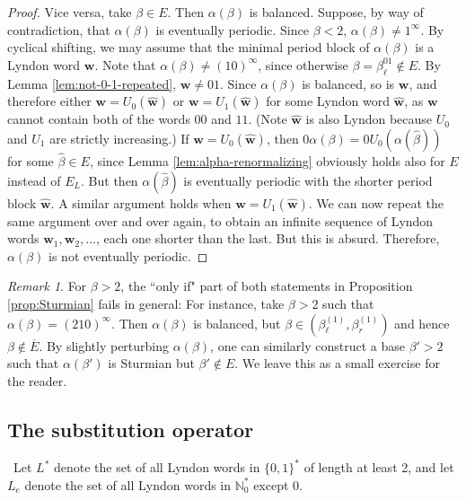 \documentclass[11pt]{amsart}
\theoremstyle{definition}
\theoremstyle{remark}
\newtheorem{remark}[theorem]{Remark}
\numberwithin{equation}{section}
\newcommand{\N}{\ensuremath{\mathbb{N}}}
\newcommand{\w}{\mathbf{w}}
\newcommand{\f}{\infty}
\newcommand{\al}{\alpha}
\begin{document}
\begin{proof}
Vice versa, take $\beta\in E$. Then $\al(\beta)$ is balanced. 
Suppose, by way of contradiction, that $\al(\beta)$ is eventually periodic. Since $\beta<2$, $\al(\beta)\neq 1^\f$. By cyclical shifting, we may assume that the minimal period block of $\al(\beta)$ is a Lyndon word $\w$. Note that $\al(\beta)\ne (10)^\f$, since otherwise $\beta=\beta_\ell^{01}\notin E$. By Lemma \ref{lem:not-0-1-repeated}, $\w\neq 01$. Since $\al(\beta)$ is balanced, so is $\w$, and therefore either $\w=U_0(\hat{\w})$ or $\w=U_1(\hat{\w})$ for some Lyndon word $\hat{\w}$, as $\w$ cannot contain both of the words $00$ and $11$.  (Note $\hat{\w}$ is also Lyndon because $U_0$ and $U_1$ are strictly increasing.) If $\w=U_0(\hat{\w})$, then $0\al(\beta)=0U_0(\al(\hat{\beta}))$ for some $\hat{\beta}\in E$, since Lemma \ref{lem:alpha-renormalizing} obviously holds also for $E$ instead of $E_L$. But then $\al(\hat{\beta})$ is eventually periodic with the shorter period block $\hat{\w}$. A similar argument holds when $\w=U_1(\hat{\w})$. We can now repeat the same argument over and over again, to obtain an infinite sequence of Lyndon words $\w_1,\w_2,\dots$, each one shorter than the last. But this is absurd. Therefore, $\al(\beta)$ is not eventually periodic.
\end{proof}

{
\begin{remark} \label{rem:no-converses}
{\rm
For $\beta>2$, the ``only if" part of both statements in Proposition \ref{prop:Sturmian} fails in general: For instance, take $\beta>2$ such that $\al(\beta)=(210)^\f$. Then $\al(\beta)$ is balanced, but $\beta\in(\beta_\ell^{(1)},\beta_r^{(1)})$ and hence $\beta\not\in\overline{E}$. By slightly perturbing $\al(\beta)$, one can similarly construct a base $\beta'>2$ such that $\al(\beta')$ is Sturmian but $\beta'\not\in E$. We leave this as a small exercise for the reader. 
}
\end{remark}
}

\subsection{The substitution operator} \label{subsec:substitution}
\ 
{Let $L^*$ denote the set of all Lyndon words in $\{0,1\}^*$ of length at least 2, and let $L_e$ denote the set of all Lyndon words in $\N_0^*$ except $0$.}
\end{document}

